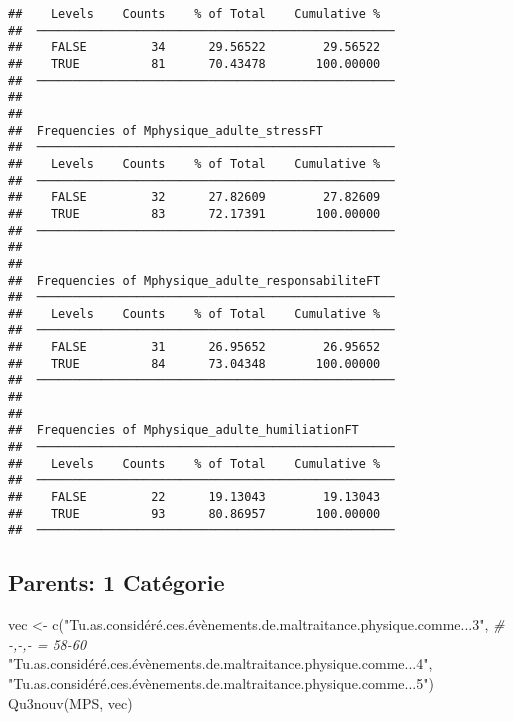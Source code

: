 \documentclass[
]{article}
\newenvironment{Shaded}{\begin{snugshade}}{\end{snugshade}}
\newcommand{\CommentTok}[1]{\textcolor[rgb]{0.56,0.35,0.01}{\textit{#1}}}
\newcommand{\FunctionTok}[1]{\textcolor[rgb]{0.00,0.00,0.00}{#1}}
\newcommand{\NormalTok}[1]{#1}
\newcommand{\OtherTok}[1]{\textcolor[rgb]{0.56,0.35,0.01}{#1}}
\newcommand{\StringTok}[1]{\textcolor[rgb]{0.31,0.60,0.02}{#1}}
\begin{document}
\begin{verbatim}
##    Levels    Counts    % of Total    Cumulative %   
##  ────────────────────────────────────────────────── 
##    FALSE         34      29.56522        29.56522   
##    TRUE          81      70.43478       100.00000   
##  ────────────────────────────────────────────────── 
## 
## 
##  Frequencies of Mphysique_adulte_stressFT           
##  ────────────────────────────────────────────────── 
##    Levels    Counts    % of Total    Cumulative %   
##  ────────────────────────────────────────────────── 
##    FALSE         32      27.82609        27.82609   
##    TRUE          83      72.17391       100.00000   
##  ────────────────────────────────────────────────── 
## 
## 
##  Frequencies of Mphysique_adulte_responsabiliteFT   
##  ────────────────────────────────────────────────── 
##    Levels    Counts    % of Total    Cumulative %   
##  ────────────────────────────────────────────────── 
##    FALSE         31      26.95652        26.95652   
##    TRUE          84      73.04348       100.00000   
##  ────────────────────────────────────────────────── 
## 
## 
##  Frequencies of Mphysique_adulte_humiliationFT      
##  ────────────────────────────────────────────────── 
##    Levels    Counts    % of Total    Cumulative %   
##  ────────────────────────────────────────────────── 
##    FALSE         22      19.13043        19.13043   
##    TRUE          93      80.86957       100.00000   
##  ──────────────────────────────────────────────────
\end{verbatim}

\hypertarget{parents-1-catuxe9gorie}{%
\subsection{Parents: 1 Catégorie}\label{parents-1-catuxe9gorie}}

\begin{Shaded}
\begin{Highlighting}[]
\NormalTok{vec }\OtherTok{\textless{}{-}} \FunctionTok{c}\NormalTok{(}\StringTok{"Tu.as.considéré.ces.évènements.de.maltraitance.physique.comme...3"}\NormalTok{,  }\CommentTok{\# {-},{-},{-} = 58{-}60}
         \StringTok{"Tu.as.considéré.ces.évènements.de.maltraitance.physique.comme...4"}\NormalTok{,}
         \StringTok{"Tu.as.considéré.ces.évènements.de.maltraitance.physique.comme...5"}\NormalTok{)}
\FunctionTok{Qu3nouv}\NormalTok{(MPS, vec)}
\end{Highlighting}
\end{Shaded}
\end{document}
